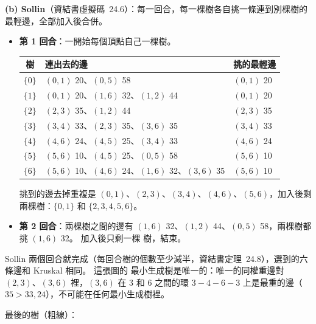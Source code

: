 \begin{pastsoln}
\textbf{(b) Sollin}（資結書虛擬碼~24.6）：每一回合，每一棵樹各自挑一條連到別棵樹的最輕邊，全部加入後合併。
\begin{itemize}
\item \textbf{第 1 回合}：一開始每個頂點自己一棵樹。
\begin{center}
\small
\begin{tabular}{cll}
\toprule
樹 & 連出去的邊 & 挑的最輕邊 \\
\midrule
$\{0\}$ & $(0,1)$ 20、$(0,5)$ 58 & $(0,1)$ 20 \\
$\{1\}$ & $(0,1)$ 20、$(1,6)$ 32、$(1,2)$ 44 & $(0,1)$ 20 \\
$\{2\}$ & $(2,3)$ 35、$(1,2)$ 44 & $(2,3)$ 35 \\
$\{3\}$ & $(3,4)$ 33、$(2,3)$ 35、$(3,6)$ 35 & $(3,4)$ 33 \\
$\{4\}$ & $(4,6)$ 24、$(4,5)$ 25、$(3,4)$ 33 & $(4,6)$ 24 \\
$\{5\}$ & $(5,6)$ 10、$(4,5)$ 25、$(0,5)$ 58 & $(5,6)$ 10 \\
$\{6\}$ & $(5,6)$ 10、$(4,6)$ 24、$(1,6)$ 32、$(3,6)$ 35 & $(5,6)$ 10 \\
\bottomrule
\end{tabular}
\end{center}
挑到的邊去掉重複是 $(0,1)$、$(2,3)$、$(3,4)$、$(4,6)$、$(5,6)$，加入後剩兩棵樹：$\{0, 1\}$ 和 $\{2, 3, 4, 5, 6\}$。
\item \textbf{第 2 回合}：兩棵樹之間的邊有 $(1,6)$ 32、$(1,2)$ 44、$(0,5)$ 58，兩棵樹都挑 $(1,6)$ 32。 加入後只剩一棵
樹，結束。
\end{itemize}
Sollin 兩個回合就完成（每回合樹的個數至少減半，資結書定理~24.8），選到的六條邊和 Kruskal 相同。 這張圖的
最小生成樹是唯一的：唯一的同權重邊對 $(2,3)$、$(3,6)$ 裡，$(3,6)$ 在 $3$ 和 $6$ 之間的環
$3\!-\!4\!-\!6\!-\!3$ 上是最重的邊（$35 > 33, 24$），不可能在任何最小生成樹裡。

最後的樹（粗線）：
\begin{center}
\end{center}
\end{pastsoln}
